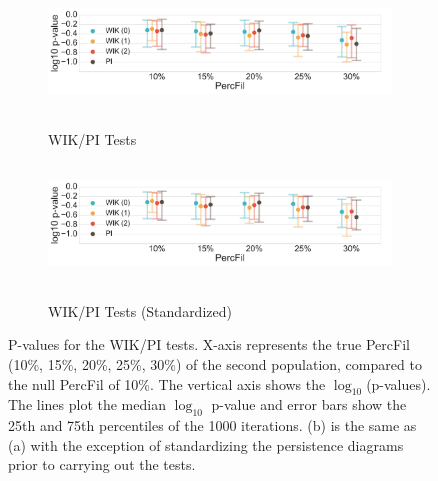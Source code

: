 \documentclass[12pt]{article}
\begin{document}
\begin{figure}[htp!]
  \centering
  \begin{subfigure}{.75\textwidth}
    \centering
    \caption{WIK/PI Tests}
    \includegraphics[height = 1.25in]{figure_8_weighted_contour_group.pdf}
    \label{fig:sub_weight}
  \end{subfigure}
  \begin{subfigure}{.75\textwidth}
    \centering
    \caption{WIK/PI Tests (Standardized)}
    \includegraphics[height = 1.25in]{figure_8_weighted_contour_group_normed.pdf}
    \label{fig:sub_weight_normed}
  \end{subfigure}
\label{fig:sub_weight_results}
\caption{P-values for the WIK/PI tests. X-axis represents the true PercFil (10\%, 15\%, 20\%, 25\%, 30\%) of the second population, compared to the null PercFil of 10\%.
The vertical axis shows the $\log_{10}$(p-values). The lines plot the median $\log_{10}$ p-value and error bars show the 25th and 75th percentiles of the 1000 iterations. (b) is the same as (a) with the exception of standardizing the persistence diagrams prior to carrying out the tests. }
\end{figure}
\end{document}
